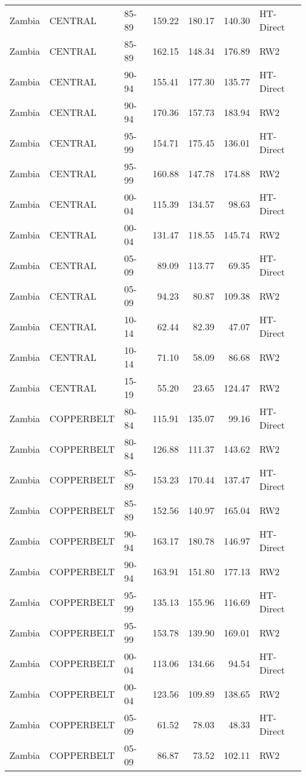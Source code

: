 \begin{longtable}{lllrrrl}
  Zambia & CENTRAL & 85-89 & 159.22 & 180.17 & 140.30 & HT-Direct \\ 
  Zambia & CENTRAL & 85-89 & 162.15 & 148.34 & 176.89 & RW2 \\ 
  Zambia & CENTRAL & 90-94 & 155.41 & 177.30 & 135.77 & HT-Direct \\ 
  Zambia & CENTRAL & 90-94 & 170.36 & 157.73 & 183.94 & RW2 \\ 
  Zambia & CENTRAL & 95-99 & 154.71 & 175.45 & 136.01 & HT-Direct \\ 
  Zambia & CENTRAL & 95-99 & 160.88 & 147.78 & 174.88 & RW2 \\ 
  Zambia & CENTRAL & 00-04 & 115.39 & 134.57 & 98.63 & HT-Direct \\ 
  Zambia & CENTRAL & 00-04 & 131.47 & 118.55 & 145.74 & RW2 \\ 
  Zambia & CENTRAL & 05-09 & 89.09 & 113.77 & 69.35 & HT-Direct \\ 
  Zambia & CENTRAL & 05-09 & 94.23 & 80.87 & 109.38 & RW2 \\ 
  Zambia & CENTRAL & 10-14 & 62.44 & 82.39 & 47.07 & HT-Direct \\ 
  Zambia & CENTRAL & 10-14 & 71.10 & 58.09 & 86.68 & RW2 \\ 
  Zambia & CENTRAL & 15-19 & 55.20 & 23.65 & 124.47 & RW2 \\ 
  Zambia & COPPERBELT & 80-84 & 115.91 & 135.07 & 99.16 & HT-Direct \\ 
  Zambia & COPPERBELT & 80-84 & 126.88 & 111.37 & 143.62 & RW2 \\ 
  Zambia & COPPERBELT & 85-89 & 153.23 & 170.44 & 137.47 & HT-Direct \\ 
  Zambia & COPPERBELT & 85-89 & 152.56 & 140.97 & 165.04 & RW2 \\ 
  Zambia & COPPERBELT & 90-94 & 163.17 & 180.78 & 146.97 & HT-Direct \\ 
  Zambia & COPPERBELT & 90-94 & 163.91 & 151.80 & 177.13 & RW2 \\ 
  Zambia & COPPERBELT & 95-99 & 135.13 & 155.96 & 116.69 & HT-Direct \\ 
  Zambia & COPPERBELT & 95-99 & 153.78 & 139.90 & 169.01 & RW2 \\ 
  Zambia & COPPERBELT & 00-04 & 113.06 & 134.66 & 94.54 & HT-Direct \\ 
  Zambia & COPPERBELT & 00-04 & 123.56 & 109.89 & 138.65 & RW2 \\ 
  Zambia & COPPERBELT & 05-09 & 61.52 & 78.03 & 48.33 & HT-Direct \\ 
  Zambia & COPPERBELT & 05-09 & 86.87 & 73.52 & 102.11 & RW2 \\ 

\end{longtable}
